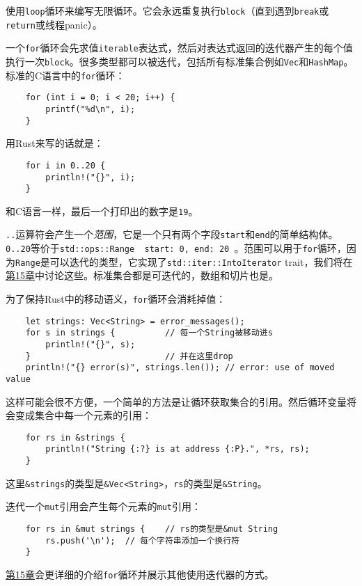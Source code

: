 使用\texttt{loop}循环来编写无限循环。它会永远重复执行\texttt{block}（直到遇到\texttt{break}或\texttt{return}或线程panic）。

一个\texttt{for}循环会先求值\texttt{iterable}表达式，然后对表达式返回的迭代器产生的每个值执行一次\texttt{block}。很多类型都可以被迭代，包括所有标准集合例如\texttt{Vec}和\texttt{HashMap}。标准的C语言中的\texttt{for}循环：
\begin{verbatim}
    for (int i = 0; i < 20; i++) {
        printf("%d\n", i);
    }
\end{verbatim}
用Rust来写的话就是：
\begin{verbatim}
    for i in 0..20 {
        println!("{}", i);
    }
\end{verbatim}
和C语言一样，最后一个打印出的数字是\texttt{19}。

\texttt{..}运算符会产生一个\emph{范围}，它是一个只有两个字段\texttt{start}和\texttt{end}的简单结构体。\texttt{0..20}等价于\texttt{std::ops::Range { start: 0, end: 20 }}。范围可以用于\texttt{for}循环，因为\texttt{Range}是可以迭代的类型，它实现了\texttt{std::iter::IntoIterator} trait，我们将在\hyperref[ch15]{第15章}中讨论这些。标准集合都是可迭代的，数组和切片也是。

为了保持Rust中的移动语义，\texttt{for}循环会消耗掉值：
\begin{verbatim}
    let strings: Vec<String> = error_messages();
    for s in strings {          // 每一个String被移动进s
        println!("{}", s);
    }                           // 并在这里drop
    println!("{} error(s)", strings.len()); // error: use of moved value
\end{verbatim}

这样可能会很不方便，一个简单的方法是让循环获取集合的引用。然后循环变量将会变成集合中每一个元素的引用：
\begin{verbatim}
    for rs in &strings {
        println!("String {:?} is at address {:P}.", *rs, rs);
    }
\end{verbatim}

这里\texttt{\&strings}的类型是\texttt{\&Vec<String>}，\texttt{rs}的类型是\texttt{\&String}。

迭代一个\texttt{mut}引用会产生每个元素的\texttt{mut}引用：
\begin{verbatim}
    for rs in &mut strings {    // rs的类型是&mut String
        rs.push('\n');  // 每个字符串添加一个换行符
    }
\end{verbatim}

\hyperref[ch15]{第15章}会更详细的介绍\texttt{for}循环并展示其他使用迭代器的方式。

